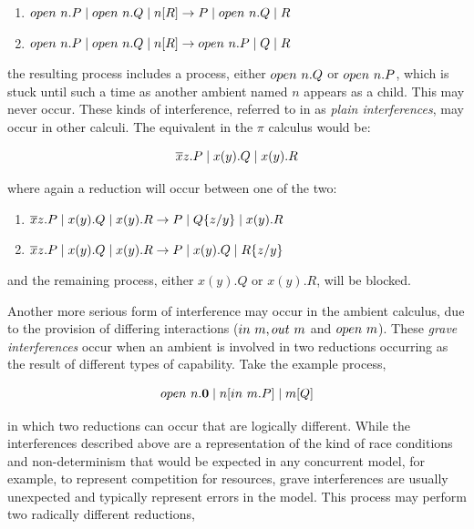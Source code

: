 \begin{enumerate}
\item $open\ n.P \;|\; open\ n.Q \;|\; n[R] \rightarrow P \;|\; open\ n.Q \;|\; R$
\item $open\ n.P \;|\; open\ n.Q \;|\; n[R] \rightarrow
  open\ n.P \;|\; Q \;|\; R$
\end{enumerate}


\noindent the resulting process includes a process, either $open\ n.Q$
or $open\ n.P$, which is stuck until such a time as another ambient
named $n$ appears as a child.  This may never occur.  These kinds of
interference, referred to in \cite{sangiorgi:mobsafeambients} as
\emph{plain interferences}, may occur in other calculi.  The equivalent
in the $\pi$ calculus would be:

\begin{equation}
\overline{x}z.P \;|\; x(y).Q \;|\; x(y).R
\end{equation}

\noindent where again a reduction will occur between one of the two:

\begin{enumerate}
\item $\overline{x}z.P \;|\; x(y).Q \;|\; x(y).R \rightarrow P \;|\; Q\{z/y\}
  \;|\; x(y).R$
\item $\overline{x}z.P \;|\; x(y).Q \;|\; x(y).R \rightarrow P \;|\; x(y).Q
  \;|\; R\{z/y\}$
\end{enumerate}

\noindent and the remaining process, either $x(y).Q$ or $x(y).R$, will
be blocked.

Another more serious form of interference may occur in the ambient
calculus, due to the provision of differing interactions ($in\ m,
out\ m$ and $open\ m$).  These \emph{grave interferences} occur
when an ambient is involved in two reductions occurring as the result
of different types of capability.  Take the example process,

\begin{equation}
open\ n.\textbf{0} \;|\; n[in\ m.P] \;|\; m[Q]
\end{equation}

\noindent in which two reductions can occur that are logically
different.  While the interferences described above are a
representation of the kind of race conditions and non-determinism that
would be expected in any concurrent model, for example, to represent
competition for resources, grave interferences are usually unexpected
and typically represent errors in the model.  This process may perform
two radically different reductions,

